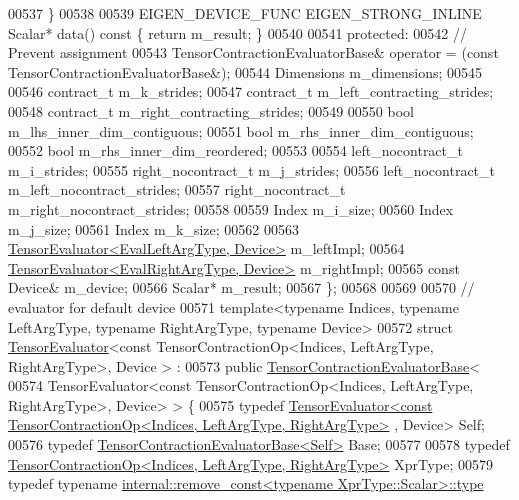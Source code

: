 \begin{DoxyCode}
00537   \}
00538 
00539   EIGEN\_DEVICE\_FUNC EIGEN\_STRONG\_INLINE Scalar* data()\textcolor{keyword}{ const }\{ \textcolor{keywordflow}{return} m\_result; \}
00540 
00541   \textcolor{keyword}{protected}:
00542   \textcolor{comment}{// Prevent assignment}
00543   TensorContractionEvaluatorBase& operator = (\textcolor{keyword}{const} TensorContractionEvaluatorBase&);
00544   Dimensions m\_dimensions;
00545 
00546   contract\_t m\_k\_strides;
00547   contract\_t m\_left\_contracting\_strides;
00548   contract\_t m\_right\_contracting\_strides;
00549 
00550   \textcolor{keywordtype}{bool} m\_lhs\_inner\_dim\_contiguous;
00551   \textcolor{keywordtype}{bool} m\_rhs\_inner\_dim\_contiguous;
00552   \textcolor{keywordtype}{bool} m\_rhs\_inner\_dim\_reordered;
00553 
00554   left\_nocontract\_t m\_i\_strides;
00555   right\_nocontract\_t m\_j\_strides;
00556   left\_nocontract\_t m\_left\_nocontract\_strides;
00557   right\_nocontract\_t m\_right\_nocontract\_strides;
00558 
00559   Index m\_i\_size;
00560   Index m\_j\_size;
00561   Index m\_k\_size;
00562 
00563   \hyperlink{struct_eigen_1_1_tensor_evaluator}{TensorEvaluator<EvalLeftArgType, Device>} m\_leftImpl;
00564   \hyperlink{struct_eigen_1_1_tensor_evaluator}{TensorEvaluator<EvalRightArgType, Device>} m\_rightImpl;
00565   \textcolor{keyword}{const} Device& m\_device;
00566   Scalar* m\_result;
00567 \};
00568 
00569 
00570 \textcolor{comment}{// evaluator for default device}
00571 \textcolor{keyword}{template}<\textcolor{keyword}{typename} Indices, \textcolor{keyword}{typename} LeftArgType, \textcolor{keyword}{typename} RightArgType, \textcolor{keyword}{typename} Device>
00572 \textcolor{keyword}{struct }\hyperlink{struct_eigen_1_1_tensor_evaluator}{TensorEvaluator}<const TensorContractionOp<Indices, LeftArgType, RightArgType>, Device
      > :
00573     \textcolor{keyword}{public} \hyperlink{struct_eigen_1_1_tensor_contraction_evaluator_base}{TensorContractionEvaluatorBase}<
00574       TensorEvaluator<const TensorContractionOp<Indices, LeftArgType, RightArgType>, Device> > \{
00575   \textcolor{keyword}{typedef} 
      \hyperlink{struct_eigen_1_1_tensor_evaluator}{TensorEvaluator<const TensorContractionOp<Indices, LeftArgType, RightArgType>}
      , Device> Self;
00576   \textcolor{keyword}{typedef} \hyperlink{struct_eigen_1_1_tensor_contraction_evaluator_base}{TensorContractionEvaluatorBase<Self>} Base;
00577 
00578   \textcolor{keyword}{typedef} \hyperlink{class_eigen_1_1_tensor_contraction_op}{TensorContractionOp<Indices, LeftArgType, RightArgType>}
       XprType;
00579   \textcolor{keyword}{typedef} \textcolor{keyword}{typename} \hyperlink{group___sparse_core___module}{internal::remove\_const<typename XprType::Scalar>::type}

\end{DoxyCode}
